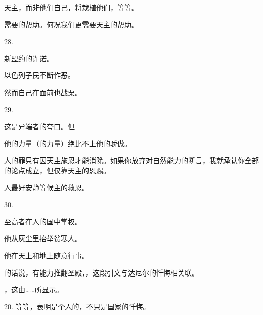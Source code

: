  天主，而非他们自己，将栽植他们，等等。\par

 需要的帮助。何况我们更需要天主的帮助。\par

28.\par

 新盟约的许诺。\par

 以色列子民不断作恶。\par

 然而自己在面前也战栗。\par

 \par

29.\par

 这是异端者的夸口。但\par

 他的力量（的力量）绝比不上他的骄傲。\par

 人的罪只有因天主施恩才能消除。如果你放弃对自然能力的断言，我就承认你全部的论点成立，但仅靠天主的恩赐。\par

 人最好安静等候主的救恩。\par

30.\par

 至高者在人的国中掌权。\par

 他从灰尘里抬举贫寒人。\par

 他在天上和地上随意行事。\par

 的话说，有能力推翻圣殿，，这段引文与达尼尔的忏悔相关联。\par

 ，这由……所显示。\par

20.  等等，表明是个人的，不只是国家的忏悔。\par

